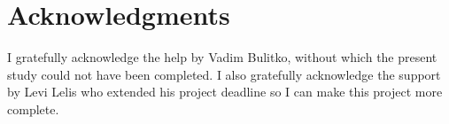 \documentclass[letterpaper]{article}
\numberwithin{equation}{section}
\numberwithin{theorem}{section}
\numberwithin{lemma}{section}
\numberwithin{df}{section}
\begin{document}
    \newpage

    \section*{Acknowledgments}

    I gratefully acknowledge the help by Vadim Bulitko, without which the present study could not have been completed.
    I also gratefully acknowledge the support by Levi Lelis who extended his project deadline so I can make this project more complete.

    
    
\end{document}
